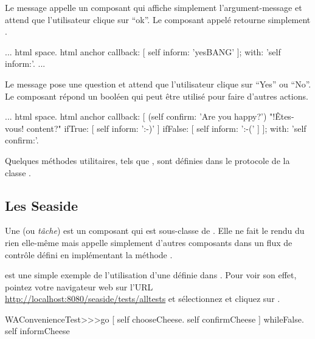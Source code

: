 \documentclass[a4paper,10pt,twoside]{book}
\begin{document}
Le message  appelle un composant qui
affiche simplement l'argument-message et attend que l'utilisateur
clique sur ``ok''.
Le composant appelé retourne simplement .

\begin{code}{}
...
	html space.
	html anchor
		callback: [ self inform: 'yesBANG' ];
		with: 'self inform:'.
...
\end{code}

Le message  pose une question et attend
que l'utilisateur clique sur ``Yes'' ou ``No''.
Le composant répond un booléen qui peut être utilisé pour faire
d'autres actions.

\begin{code}{}
...
	html space.
	html anchor
		callback: [
			(self confirm: 'Are you happy?') "!Êtes-vous! content?"
				ifTrue: [ self inform: ':-)' ]
				ifFalse: [ self inform: ':-(' ]
			];
		with: 'self confirm:'.
\end{code}

Quelques méthodes utilitaires, tels que
, sont définies dans le
protocole  de la classe .

\subsection{Les \tasks Seaside}

Une  (ou \emph{tâche}) est un composant qui est
sous-classe de .
Elle ne fait le rendu du rien elle-même mais appelle simplement
d'autres composants dans un flux de contrôle défini en implémentant la
méthode .


 est une simple exemple de l'utilisation
d'une \task définie dans . %
Pour voir son effet, pointez votre navigateur web sur l'URL
\url{http://localhost:8080/seaside/tests/alltests} et sélectionnez
 et cliquez sur .

\begin{code}{}
WAConvenienceTest>>>go
	[ self chooseCheese.
	  self confirmCheese ] whileFalse.
	self informCheese
\end{code}
\end{document}
